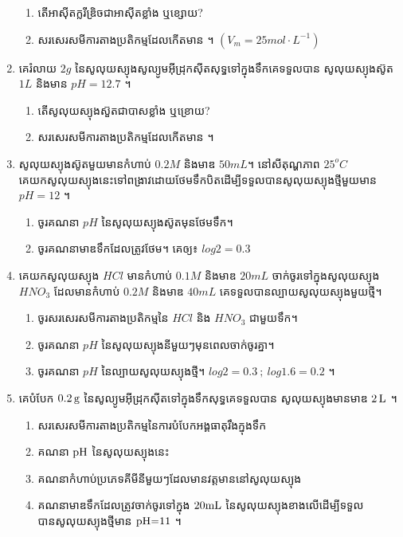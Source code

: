 \documentclass[12pt, a4paper]{article}
\begin{document}
\begin{enumerate}[m]
	\begin{enumerate}[k]
		\item តើអាសុីតក្លរីឌ្រិចជាអាសុីតខ្លាំង ឬខ្សោយ?
		\item សរសេរសមីការតាងប្រតិកម្មដែលកើតមាន ។ $\left(V_{m}=25mol\cdot L^{-1}\right)$
	\end{enumerate}\newpage
	\item គេរំលាយ $2g$ នៃសូលុយស្យុងសូល្យូមអុីដ្រុកសុីតសុទ្ធទៅក្នុងទឹកគេទទួលបាន សូលុយស្យុងស៊ូត $1L$ និងមាន $pH=12.7$ ។
	\begin{enumerate}[k]
		\item តើសូលុយស្យុងស៊ួតជាបាសខ្លាំង ឬខ្រោយ?
		\item សរសេរសមីការតាងប្រតិកម្មដែលកើតមាន ។
	\end{enumerate}
	\item សូលុយស្យុងស៊ូតមួយមានកំហាប់ $0.2M$ និងមាឌ $50mL$។ នៅសីតុណ្ហភាព $25^{o}C$ គេយកសូលុយស្យុងនេះទៅពង្រាវដោយថែមទឹកបិតដើម្បីទទួលបានសូលុយស្យុងថ្មីមួយមាន $pH=12$ ។
	\begin{enumerate}[k]
		\item ចូរគណនា $pH$ នៃសូលុយស្យុងស៊ូតមុនថែមទឹក។
		\item ចូរគណនាមាឌទឹកដែលត្រូវថែម។ គេឲ្យ៖ $log2=0.3$
	\end{enumerate}
	\item គេយកសូលុយស្យុង $HCl$ មានកំហាប់ $0.1M$ និងមាឌ $20mL$ ចាក់ចូរទៅក្នុងសូលុយស្យុង $HNO_{3}$ ដែលមានកំហាប់ $0.2M$ និងមាឌ $40mL$ គេទទួលបានល្បាយសូលុយស្យុងមួយថ្មី។
	\begin{enumerate}[k]
		\item ចូរសរសេរសមីការតាងប្រតិកម្មនៃ $HCl$ និង $HNO_{3}$ ជាមួយទឹក។
		\item ចូរគណនា $pH$ នៃសូលុយស្យុងនីមួយៗមុនពេលចាក់ចូរគ្នា។
		\item ចូរគណនា $pH$ នៃល្បាយសូលុយស្យុងថ្មី។ $log2=0.3~;~log1.6=0.2$ ។
	\end{enumerate}
	\item គេបំបែក $\ce{0.2g}$ នៃសូល្យូមអុីដ្រុកសុីតទៅក្នុងទឹកសុទ្ធគេទទួលបាន សូលុយស្យុងមានមាឌ $\ce{2L}$ ។
	\begin{enumerate}[k]
		\item សរសេរសមីការតាងប្រតិកម្មនៃការបំបែកអង្គធាតុរឹងក្នុងទឹក 
		\item គណនា $\ce{pH}$ នៃសូលុយស្យុងនេះ
		\item គណនាកំហាប់ប្រភេទគីមីនីមួយៗដែលមានវត្តមាននៅសូលុយស្យុង 
		\item គណនាមាឌទឹកដែលត្រូវចាក់ចូរទៅក្នុង $\ce{20 mL}$ នៃសូលុយស្យុងខាងលើដើម្បីទទួលបានសូលុយស្យុងថ្មីមាន $\ce{pH=11}$ ។
	\end{enumerate}

\end{enumerate}
\end{document}
